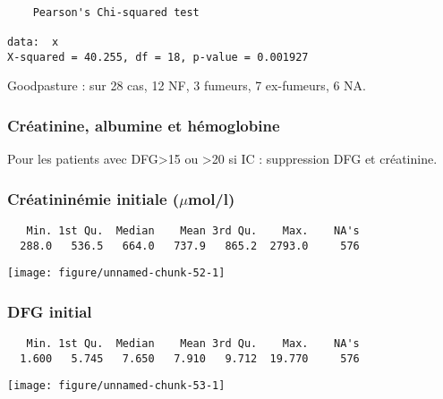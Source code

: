 \documentclass[11pt,a4paper]{article}\usepackage[]{graphicx}\usepackage[]{color}
\makeatletter
\def\maxwidth{ %
  \ifdim\Gin@nat@width>\linewidth
    \linewidth
  \else
    \Gin@nat@width
  \fi
}
\newenvironment{kframe}{%
 \def\at@end@of@kframe{}%
 \ifinner\ifhmode%
  \def\at@end@of@kframe{\end{minipage}}%
  \begin{minipage}{\columnwidth}%
 \fi\fi%
 \def\FrameCommand##1{\hskip\@totalleftmargin \hskip-\fboxsep
 \colorbox{shadecolor}{##1}\hskip-\fboxsep
     \hskip-\linewidth \hskip-\@totalleftmargin \hskip\columnwidth}%
 \MakeFramed {\advance\hsize-\width
   \@totalleftmargin\z@ \linewidth\hsize
   \@setminipage}}%
 {\par\unskip\endMakeFramed%
 \at@end@of@kframe}
\newenvironment{knitrout}{}{} %
\makeatother
\begin{document}
\begin{knitrout}
\color{fgcolor}\begin{kframe}
\begin{verbatim}

	Pearson's Chi-squared test

data:  x
X-squared = 40.255, df = 18, p-value = 0.001927
\end{verbatim}
\end{kframe}
\end{knitrout}

Goodpasture : sur 28 cas, 12 NF, 3 fumeurs, 7 ex-fumeurs, 6 NA.


    \subsubsection{Créatinine, albumine et hémoglobine}

Pour les patients avec DFG\textgreater15 ou \textgreater20 si IC : suppression DFG et créatinine.

\subsubsection*{Créatininémie initiale ($\mu$mol/l)}

\begin{knitrout}
\color{fgcolor}\begin{kframe}
\begin{verbatim}
   Min. 1st Qu.  Median    Mean 3rd Qu.    Max.    NA's 
  288.0   536.5   664.0   737.9   865.2  2793.0     576 
\end{verbatim}
\end{kframe}
\texttt{[image: figure/unnamed-chunk-52-1]} 

\end{knitrout}

\subsubsection*{DFG initial}

\begin{knitrout}
\color{fgcolor}\begin{kframe}
\begin{verbatim}
   Min. 1st Qu.  Median    Mean 3rd Qu.    Max.    NA's 
  1.600   5.745   7.650   7.910   9.712  19.770     576 
\end{verbatim}
\end{kframe}
\texttt{[image: figure/unnamed-chunk-53-1]} 

\end{knitrout}
\end{document}
